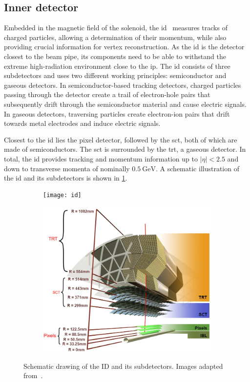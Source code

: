 \subsection{Inner detector}

Embedded in the magnetic field of the solenoid, the \gls{id}~\cite{Aad:2008zzm} measures tracks of charged particles, allowing a determination of their momentum, while also providing crucial information for vertex reconstruction. As the \gls{id} is the detector closest to the beam pipe, its components need to be able to withstand the extreme high-radiation environment close to the \gls{ip}. The \gls{id} consists of three subdetectors and uses two different working principles: semiconductor and gaseous detectors. In semiconductor-based tracking detectors, charged particles passing through the detector create a trail of electron-hole pairs that subsequently drift through the semiconductor material and cause electric signals. In gaseous detectors, traversing particles create electron-ion pairs that drift towards metal electrodes and induce electric signals.

 Closest to the \gls{id} lies the pixel detector, followed by the \gls{sct}, both of which are made of semiconductors. The \gls{sct} is surrounded by the \gls{trt}, a gaseous detector. In total, the \gls{id} provides tracking and momentum information up to $\vert\eta\vert < 2.5$ and down to transverse momenta of nominally $\SI{0.5}{\GeV}$. A schematic illustration of the \gls{id} and its subdetectors is shown in \cref{fig:ID_schematic}. 

\begin{figure}
	\centering
	\begin{subfigure}[b]{0.45\linewidth}
		\centering\texttt{[image: id]}
	\end{subfigure}\hfill
	\begin{subfigure}[b]{0.45\linewidth}
		\centering\includegraphics[width=\textwidth]{ibl}
	\end{subfigure}%
	\caption{Schematic drawing of the ID and its subdetectors. Images adapted from~\cite{Pequenao:1095926, Potamianos:2209070}.}\label{fig:ID_schematic}
\end{figure}

